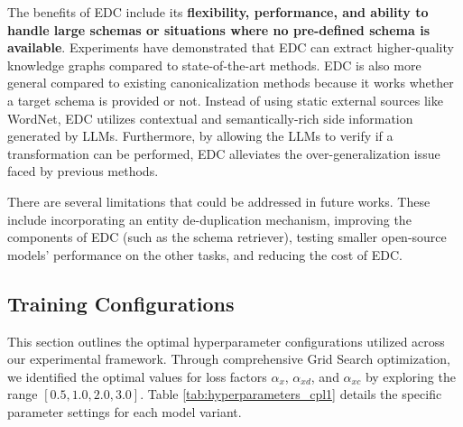 The benefits of EDC include its \textbf{flexibility, performance, and ability to handle large schemas or situations where no pre-defined schema is available}. Experiments have demonstrated that EDC can extract higher-quality knowledge graphs compared to state-of-the-art methods. EDC is also more general compared to existing canonicalization methods because it works whether a target schema is provided or not. Instead of using static external sources like WordNet, EDC utilizes contextual and semantically-rich side information generated by LLMs. Furthermore, by allowing the LLMs to verify if a transformation can be performed, EDC alleviates the over-generalization issue faced by previous methods.

There are several limitations that could be addressed in future works. These include incorporating an entity de-duplication mechanism, improving the components of EDC (such as the schema retriever), testing smaller open-source models' performance on the other tasks, and reducing the cost of EDC.



\subsection{Training Configurations}
This section outlines the optimal hyperparameter configurations utilized across our experimental framework. Through comprehensive Grid Search optimization, we identified the optimal values for loss factors $\alpha_{x}$, $\alpha_{xd}$, and $\alpha_{xc}$ by exploring the range $[0.5, 1.0, 2.0, 3.0]$. Table \ref{tab:hyperparameters_cpl1} details the specific parameter settings for each model variant.


